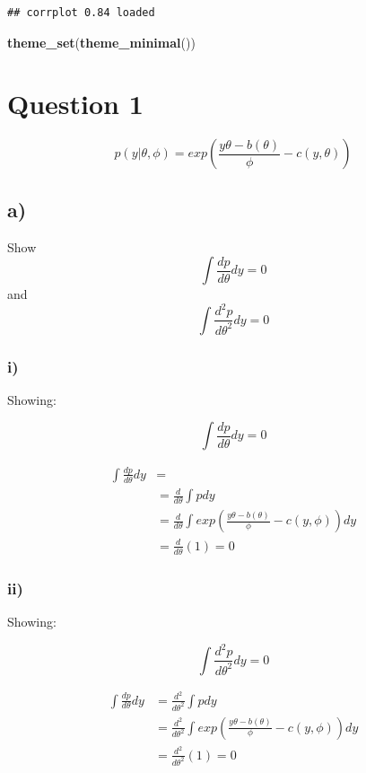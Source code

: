 \documentclass[]{article}
\newenvironment{Shaded}{\begin{snugshade}}{\end{snugshade}}
\newcommand{\KeywordTok}[1]{\textcolor[rgb]{0.13,0.29,0.53}{\textbf{#1}}}
\newcommand{\NormalTok}[1]{#1}
\begin{document}
\begin{verbatim}
## corrplot 0.84 loaded
\end{verbatim}

\begin{Shaded}
\begin{Highlighting}[]
\KeywordTok{theme_set}\NormalTok{(}\KeywordTok{theme_minimal}\NormalTok{())}
\end{Highlighting}
\end{Shaded}

\hypertarget{question-1}{%
\section{Question 1}\label{question-1}}

\[
p(y | \theta, \phi) = exp \left( \frac{y \theta - b(\theta)}{\phi} - c(y, \theta) \right)
\]

\hypertarget{a}{%
\subsection{a)}\label{a}}

Show \[\int \frac{dp}{d\theta} dy = 0\] and
\[\int \frac{d^2p}{d\theta^2} dy = 0\]

\hypertarget{i}{%
\subsubsection{i)}\label{i}}

Showing:

\[
\int \frac{dp}{d\theta} dy = 0
\]

\[
\begin{aligned}
\int \frac{dp}{d\theta} dy &= \\
&= \frac{d}{d\theta} \int p dy \\
&= \frac{d}{d\theta} \int exp \left( \frac{y \theta - b(\theta)}{\phi} - c(y, \phi) \right) dy \\
&= \frac{d}{d\theta}(1) = 0
\end{aligned}
\]

\hypertarget{ii}{%
\subsubsection{ii)}\label{ii}}

Showing:

\[
\int \frac{d^2p}{d\theta^2} dy = 0
\]

\[
\begin{aligned}
\int \frac{dp}{d\theta} dy &=  \frac{d^2}{d\theta^2} \int p dy \\
&= \frac{d^2}{d\theta^2} \int exp \left( \frac{y \theta - b(\theta)}{\phi} - c(y, \phi) \right) dy \\
&= \frac{d^2}{d\theta^2}(1) = 0
\end{aligned}
\]
\end{document}
